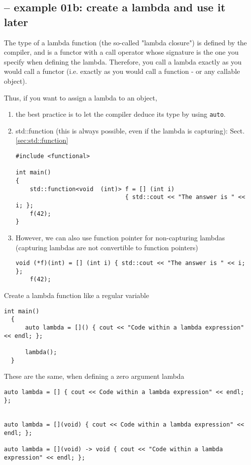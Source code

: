 \subsection{-- example 01b: create a lambda and use it later}

The type of a lambda function (the so-called "lambda closure") is defined by the
compiler, and is a functor with a call operator whose signature is the one you
specify when defining the lambda. Therefore, you call a lambda exactly as you
would call a functor (i.e. exactly as you would call a function - or any
callable object).

Thus, if you want to assign a lambda to an object, 

\begin{enumerate}

  \item the best practice is to let the compiler deduce its type by using \verb!auto!.

  \item  std::function (this is always possible, even if the lambda is capturing): Sect.\ref{sec:std::function}
  
\begin{lstlisting}
#include <functional>

int main()
{
    std::function<void  (int)> f = [] (int i) 
                               { std::cout << "The answer is " << i; };
    f(42);
}
\end{lstlisting}
  
  \item However, we can also use function pointer for non-capturing lambdas (capturing lambdas are not convertible to function pointers)

\begin{lstlisting}
void (*f)(int) = [] (int i) { std::cout << "The answer is " << i; };
    f(42);
\end{lstlisting}


\end{enumerate}


Create a lambda function like a regular variable

\begin{lstlisting}
int main()
  {
      auto lambda = []() { cout << "Code within a lambda expression" << endl; };
      
      lambda();
  }
\end{lstlisting}


These are the same, when defining a zero argument lambda
\begin{verbatim}
auto lambda = [] { cout << Code within a lambda expression" << endl; };


auto lambda = [](void) { cout << Code within a lambda expression" << endl; };

auto lambda = [](void) -> void { cout << "Code within a lambda expression" << endl; };
\end{verbatim}

